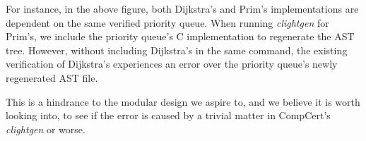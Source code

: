 For instance, in the above figure, both Dijkstra's and Prim's implementations are dependent on the same verified priority queue. When running \textit{clightgen} for Prim's, we include the priority queue's C implementation to regenerate the AST tree. However, without including Dijkstra's in the same command, the existing verification of Dijkstra's experiences an error over the priority queue's newly regenerated AST file.

This is a hindrance to the modular design we aspire to, and we believe it is worth looking into, to see if the error is caused by a trivial matter in CompCert's \textit{clightgen} or worse.